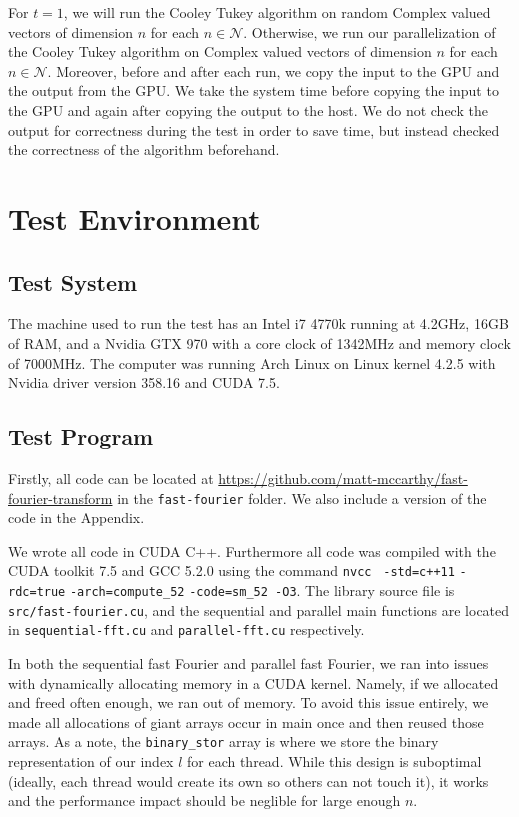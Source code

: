 \documentclass[notitlepage, twocolumn]{article}
\begin{document}
For $t=1$, we will run the Cooley Tukey algorithm on random Complex valued vectors of dimension $n$ for each $n\in\mathcal{N}$.
Otherwise, we run our parallelization of the Cooley Tukey algorithm on Complex valued vectors of dimension $n$ for each $n\in\mathcal{N}$.
Moreover, before and after each run, we copy the input to the GPU and the output from the GPU.
We take the system time before copying the input to the GPU and again after copying the output to the host.
We do not check the output for correctness during the test in order to save time, but instead checked the correctness of the algorithm beforehand.

\section{Test Environment}

\subsection{Test System}

The machine used to run the test has an Intel i7 4770k running at 4.2GHz, 16GB of RAM, and a Nvidia GTX 970 with a core clock of 1342MHz and memory clock of 7000MHz.
The computer was running Arch Linux on Linux kernel 4.2.5 with Nvidia driver version 358.16 and CUDA 7.5.

\subsection{Test Program}

Firstly, all code can be located at \url{https://github.com/matt-mccarthy/fast-fourier-transform} in the \verb|fast-fourier| folder.
We also include a version of the code in the Appendix.

We wrote all code in CUDA C++.
Furthermore all code was compiled with the CUDA toolkit 7.5 and GCC 5.2.0 using the command \verb|nvcc| \verb| -std=c++11| \verb|-rdc=true| \verb|-arch=compute_52| \verb|-code=sm_52 -O3|.
The library source file is \verb|src/fast-fourier.cu|, and the sequential and parallel main functions are located in \verb|sequential-fft.cu| and \verb|parallel-fft.cu| respectively.

In both the sequential fast Fourier and parallel fast Fourier, we ran into issues with dynamically allocating memory in a CUDA kernel.
Namely, if we allocated and freed often enough, we ran out of memory.
To avoid this issue entirely, we made all allocations of giant arrays occur in main once and then reused those arrays.
As a note, the \verb|binary_stor| array is where we store the binary representation of our index $l$ for each thread.
While this design is suboptimal (ideally, each thread would create its own so others can not touch it), it works and the performance impact should be neglible for large enough $n$.
\end{document}
